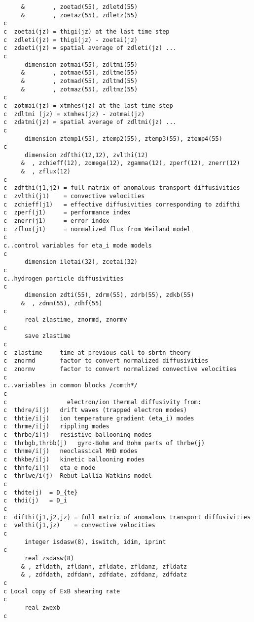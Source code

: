 \begin{verbatim}
     &        , zoetad(55), zdletd(55)
     &        , zoetaz(55), zdletz(55)
c
c  zoetai(jz) = thigi(jz) at the last time step
c  zdleti(jz) = thigi(jz) - zoetai(jz)
c  zdaeti(jz) = spatial average of zdleti(jz) ...
c
      dimension zotmai(55), zdltmi(55)
     &        , zotmae(55), zdltme(55)
     &        , zotmad(55), zdltmd(55)
     &        , zotmaz(55), zdltmz(55)
c
c  zotmai(jz) = xtmhes(jz) at the last time step
c  zdltmi (jz) = xtmhes(jz) - zotmai(jz)
c  zdatmi(jz) = spatial average of zdltmi(jz) ...
c
      dimension ztemp1(55), ztemp2(55), ztemp3(55), ztemp4(55)
c
      dimension zdfthi(12,12), zvlthi(12)
     &  , zchieff(12), zomega(12), zgamma(12), zperf(12), znerr(12)
     &  , zflux(12)
c
c  zdfthi(j1,j2) = full matrix of anomalous transport diffusivities
c  zvlthi(j1)    = convective velocities
c  zchieff(j1)   = effective diffusivities corresponding to zdifthi
c  zperf(j1)     = performance index
c  znerr(j1)     = error index
c  zflux(j1)     = normalized flux from Weiland model
c
c..control variables for eta_i mode models
c
      dimension iletai(32), zcetai(32)
c
c..hydrogen particle diffusivities
c
      dimension zdti(55), zdrm(55), zdrb(55), zdkb(55)
     &  , zdnm(55), zdhf(55)
c
      real zlastime, znormd, znormv
c
      save zlastime
c
c  zlastime     time at previous call to sbrtn theory
c  znormd       factor to convert normalized diffusivities
c  znormv       factor to convert normalized convective velocities
c
c..variables in common blocks /comth*/
c
c                 electron/ion thermal diffusivity from:
c  thdre/i(j)   drift waves (trapped electron modes)
c  thtie/i(j)   ion temperature gradient (eta_i) modes
c  thrme/i(j)   rippling modes
c  thrbe/i(j)   resistive ballooning modes
c  thrbgb,thrbb(j)   gyro-Bohm and Bohm parts of thrbe(j)
c  thnme/i(j)   neoclassical MHD modes
c  thkbe/i(j)   kinetic ballooning modes
c  thhfe/i(j)   eta_e mode
c  thrlwe/i(j)  Rebut-Lallia-Watkins model
c
c  thdte(j)  = D_{te}
c  thdi(j)   = D_i
c
c  difthi(j1,j2,jz) = full matrix of anomalous transport diffusivities
c  velthi(j1,jz)    = convective velocities
c
      integer isdasw(8), iswitch, idim, iprint
c
      real zsdasw(8)
     & , zfldath, zfldanh, zfldate, zfldanz, zfldatz
     & , zdfdath, zdfdanh, zdfdate, zdfdanz, zdfdatz
c
c Local copy of ExB shearing rate
c
      real zwexb
c

\end{verbatim}

